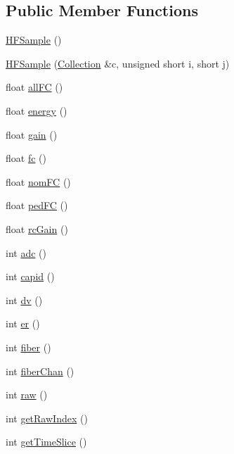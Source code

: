 \subsection*{Public Member Functions}
\begin{DoxyCompactItemize}
\item 
\hyperlink{class_h_f_sample_a1ead2dedd8fdc3ee9259ca9ef399f9f4}{H\+F\+Sample} ()
\item 
\hyperlink{class_h_f_sample_a339037881958644ba6be17a08de2b82f}{H\+F\+Sample} (\hyperlink{class_collection}{Collection} \&c, unsigned short i, short j)
\item 
float \hyperlink{class_h_f_sample_a8903a7d7f5dcc3cfc57be371e1a61d11}{all\+F\+C} ()
\item 
float \hyperlink{class_h_f_sample_ab6021ff226750df9c11bfa8a9ae956eb}{energy} ()
\item 
float \hyperlink{class_h_f_sample_a210b2ca2173c8267e3c3ba86bcad3e96}{gain} ()
\item 
float \hyperlink{class_h_f_sample_a02a219abba2029e93e0740d966ba0caf}{fc} ()
\item 
float \hyperlink{class_h_f_sample_a4356ce2fc34149ba580f72609565f9b8}{nom\+F\+C} ()
\item 
float \hyperlink{class_h_f_sample_ad99d42390ac0646749acd988680d750d}{ped\+F\+C} ()
\item 
float \hyperlink{class_h_f_sample_aebbfa0a6e0596461bc8585551e12fd38}{rc\+Gain} ()
\item 
int \hyperlink{class_h_f_sample_a6de90bbb0f186174e2c4c8788a7f7d46}{adc} ()
\item 
int \hyperlink{class_h_f_sample_a20b55dedbf364a02ee11f63f66adad86}{capid} ()
\item 
int \hyperlink{class_h_f_sample_a57495b56198eb49caf8f34b1554969f9}{dv} ()
\item 
int \hyperlink{class_h_f_sample_a38c50f0bec2401db64258670b423acd9}{er} ()
\item 
int \hyperlink{class_h_f_sample_a048dea0ef5de5cf9904fb2397427d6f4}{fiber} ()
\item 
int \hyperlink{class_h_f_sample_a82342cdd81bc6252e8272a4ff1961d08}{fiber\+Chan} ()
\item 
int \hyperlink{class_h_f_sample_a2709fd941ccbbb029bbbbdd07ceb83f4}{raw} ()
\item 
int \hyperlink{class_h_f_sample_a10a8b486edceeb52424c4f1a6b42451c}{get\+Raw\+Index} ()
\item 
int \hyperlink{class_h_f_sample_ac1daba352bc70c63b0fb2ae8504aeed6}{get\+Time\+Slice} ()
\end{DoxyCompactItemize}
